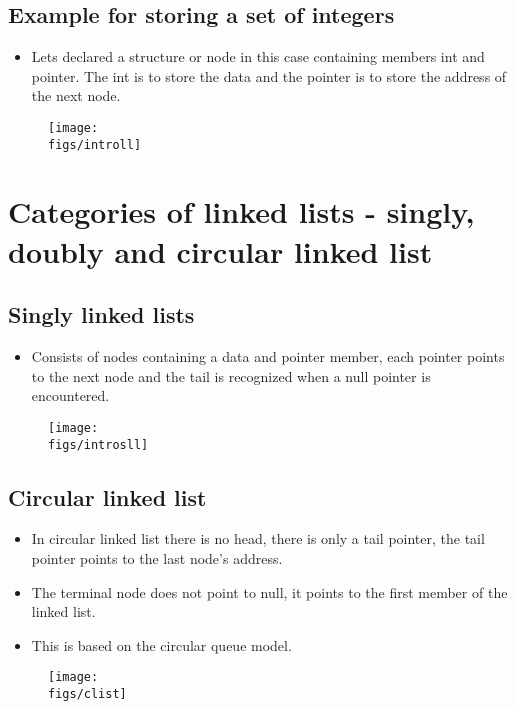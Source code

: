 \subsection{Example for storing a set of integers}
\begin{itemize}
    \item Lets declared a structure or node in this case containing members int and pointer. The int is to store the data and the pointer is to store the address of the next node. 
\end{itemize}
\begin{figure}[H]
    \centering
    \texttt{[image: \\figs/introll]} 
\end{figure}


\section{Categories of linked lists - singly, doubly and circular linked list}

\subsection{Singly linked lists}
\begin{itemize}
    \item Consists of nodes containing a data and pointer member, each pointer points to the next node and the tail is recognized when a null pointer is encountered. 
\end{itemize}
\begin{figure}[H]
    \centering
    \texttt{[image: \\figs/introsll]} 
\end{figure}

\subsection{Circular linked list}
\begin{itemize}
    \item In circular linked list there is no head, there is only a tail pointer, the tail pointer points to the last node's address.
    \item The terminal node does not point to null, it points to the first member of the linked list.
    \item This is based on the circular queue model.
\end{itemize}
\begin{figure}[H]
    \centering
    \texttt{[image: \\figs/clist]} 
\end{figure}

